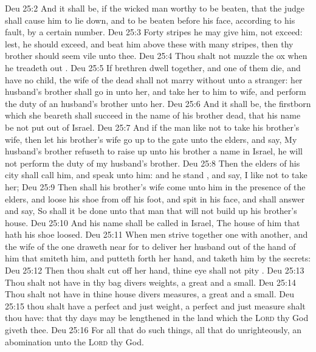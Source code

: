 \vs Deu 25:2 And it shall be, if the wicked man  worthy to be beaten, that the judge shall cause him to lie down, and to be beaten before his face, according to his fault, by a certain number.
\vs Deu 25:3 Forty stripes he may give him,  not exceed: lest,  he should exceed, and beat him above these with many stripes, then thy brother should seem vile unto thee.
\vs Deu 25:4 Thou shalt not muzzle the ox when he treadeth out .
\vs Deu 25:5 If brethren dwell together, and one of them die, and have no child, the wife of the dead shall not marry without unto a stranger: her husband's brother shall go in unto her, and take her to him to wife, and perform the duty of an husband's brother unto her.
\vs Deu 25:6 And it shall be,  the firstborn which she beareth shall succeed in the name of his brother  dead, that his name be not put out of Israel.
\vs Deu 25:7 And if the man like not to take his brother's wife, then let his brother's wife go up to the gate unto the elders, and say, My husband's brother refuseth to raise up unto his brother a name in Israel, he will not perform the duty of my husband's brother.
\vs Deu 25:8 Then the elders of his city shall call him, and speak unto him: and  he stand , and say, I like not to take her;
\vs Deu 25:9 Then shall his brother's wife come unto him in the presence of the elders, and loose his shoe from off his foot, and spit in his face, and shall answer and say, So shall it be done unto that man that will not build up his brother's house.
\vs Deu 25:10 And his name shall be called in Israel, The house of him that hath his shoe loosed.
\vs Deu 25:11 When men strive together one with another, and the wife of the one draweth near for to deliver her husband out of the hand of him that smiteth him, and putteth forth her hand, and taketh him by the secrets:
\vs Deu 25:12 Then thou shalt cut off her hand, thine eye shall not pity .
\vs Deu 25:13 Thou shalt not have in thy bag divers weights, a great and a small.
\vs Deu 25:14 Thou shalt not have in thine house divers measures, a great and a small.
\vs Deu 25:15  thou shalt have a perfect and just weight, a perfect and just measure shalt thou have: that thy days may be lengthened in the land which the \textsc{Lord} thy God giveth thee.
\vs Deu 25:16 For all that do such things,  all that do unrighteously,  an abomination unto the \textsc{Lord} thy God.
